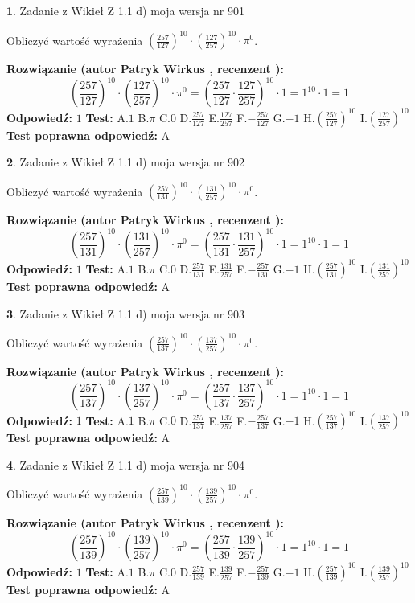 \documentclass[12pt, a4paper]{article}
\theoremstyle{definition} %
\newtheorem{zad}{}
\newcommand{\zadStart}[1]{\begin{zad}#1\newline}
\newcommand{\zadStop}{\end{zad}}
\newcommand{\rozwStart}[2]{\noindent \textbf{Rozwiązanie (autor #1 , recenzent #2): }\newline}
\newcommand{\rozwStop}{\newline}
\newcommand{\odpStart}{\noindent \textbf{Odpowiedź:}\newline}
\newcommand{\odpStop}{\newline}
\newcommand{\testStart}{\noindent \textbf{Test:}\newline}
\newcommand{\testStop}{\newline}
\newcommand{\kluczStart}{\noindent \textbf{Test poprawna odpowiedź:}\newline}
\newcommand{\kluczStop}{\newline}
\begin{document}
\zadStart{Zadanie z Wikieł Z 1.1 d) moja wersja nr 901}

Obliczyć wartość wyrażenia $(\frac{257}{127})^{10} \cdot (\frac{127}{257})^{10} \cdot \pi^{0}$.
\zadStop
\rozwStart{Patryk Wirkus}{}
$$(\frac{257}{127})^{10} \cdot (\frac{127}{257})^{10} \cdot \pi^{0} = (\frac{257}{127} \cdot \frac{127}{257})^{10} \cdot 1 = 1^{10} \cdot 1 = 1$$
\rozwStop
\odpStart
$1$
\odpStop
\testStart
A.$1$ B.$\pi$ C.$0$ D.$\frac{257}{127}$ E.$\frac{127}{257}$
F.$-\frac{257}{127}$ G.$-1$
H.$(\frac{257}{127})^{10}$
I.$(\frac{127}{257})^{10}$
\testStop
\kluczStart
A
\kluczStop



\zadStart{Zadanie z Wikieł Z 1.1 d) moja wersja nr 902}

Obliczyć wartość wyrażenia $(\frac{257}{131})^{10} \cdot (\frac{131}{257})^{10} \cdot \pi^{0}$.
\zadStop
\rozwStart{Patryk Wirkus}{}
$$(\frac{257}{131})^{10} \cdot (\frac{131}{257})^{10} \cdot \pi^{0} = (\frac{257}{131} \cdot \frac{131}{257})^{10} \cdot 1 = 1^{10} \cdot 1 = 1$$
\rozwStop
\odpStart
$1$
\odpStop
\testStart
A.$1$ B.$\pi$ C.$0$ D.$\frac{257}{131}$ E.$\frac{131}{257}$
F.$-\frac{257}{131}$ G.$-1$
H.$(\frac{257}{131})^{10}$
I.$(\frac{131}{257})^{10}$
\testStop
\kluczStart
A
\kluczStop



\zadStart{Zadanie z Wikieł Z 1.1 d) moja wersja nr 903}

Obliczyć wartość wyrażenia $(\frac{257}{137})^{10} \cdot (\frac{137}{257})^{10} \cdot \pi^{0}$.
\zadStop
\rozwStart{Patryk Wirkus}{}
$$(\frac{257}{137})^{10} \cdot (\frac{137}{257})^{10} \cdot \pi^{0} = (\frac{257}{137} \cdot \frac{137}{257})^{10} \cdot 1 = 1^{10} \cdot 1 = 1$$
\rozwStop
\odpStart
$1$
\odpStop
\testStart
A.$1$ B.$\pi$ C.$0$ D.$\frac{257}{137}$ E.$\frac{137}{257}$
F.$-\frac{257}{137}$ G.$-1$
H.$(\frac{257}{137})^{10}$
I.$(\frac{137}{257})^{10}$
\testStop
\kluczStart
A
\kluczStop



\zadStart{Zadanie z Wikieł Z 1.1 d) moja wersja nr 904}

Obliczyć wartość wyrażenia $(\frac{257}{139})^{10} \cdot (\frac{139}{257})^{10} \cdot \pi^{0}$.
\zadStop
\rozwStart{Patryk Wirkus}{}
$$(\frac{257}{139})^{10} \cdot (\frac{139}{257})^{10} \cdot \pi^{0} = (\frac{257}{139} \cdot \frac{139}{257})^{10} \cdot 1 = 1^{10} \cdot 1 = 1$$
\rozwStop
\odpStart
$1$
\odpStop
\testStart
A.$1$ B.$\pi$ C.$0$ D.$\frac{257}{139}$ E.$\frac{139}{257}$
F.$-\frac{257}{139}$ G.$-1$
H.$(\frac{257}{139})^{10}$
I.$(\frac{139}{257})^{10}$
\testStop
\kluczStart
A
\kluczStop
\end{document}
